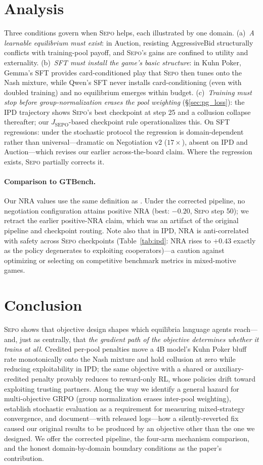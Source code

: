 \documentclass[letterpaper]{article} %
\newcommand{\sepo}{\textsc{Sepo}}
\newcommand{\Jsepo}{J_{\text{SEPO}}}
\begin{document}
\section{Analysis}
\label{sec:analysis}
Three conditions govern when \sepo{} helps, each illustrated by one domain. (a)~\emph{A learnable equilibrium must exist}: in Auction, resisting AggressiveBid structurally conflicts with training-pool payoff, and \sepo{}'s gains are confined to utility and externality. (b)~\emph{SFT must install the game's basic structure}: in Kuhn Poker, Gemma's SFT provides card-conditioned play that \sepo{} then tunes onto the Nash mixture, while Qwen's SFT never installs card-conditioning (even with doubled training) and no equilibrium emerges within budget. (c)~\emph{Training must stop before group-normalization erases the pool weighting} (\S\ref{sec:pg_loss}): the IPD trajectory shows \sepo{}'s best checkpoint at step 25 and a collusion collapse thereafter; our $\Jsepo$-based checkpoint rule operationalizes this. On SFT regressions: under the stochastic protocol the regression is domain-dependent rather than universal---dramatic on Negotiation v2 ($17\times$), absent on IPD and Auction---which revises our earlier across-the-board claim. Where the regression exists, \sepo{} partially corrects it.
\paragraph{Comparison to GTBench.} Our NRA values use the same definition as \citet{wu2024gtbench}. Under the corrected pipeline, no negotiation configuration attains positive NRA (best: $-0.20$, \sepo{} step 50); we retract the earlier positive-NRA claim, which was an artifact of the original pipeline and checkpoint routing. Note also that in IPD, NRA is anti-correlated with safety across \sepo{} checkpoints (Table~\ref{tab:ipd}: NRA rises to $+0.43$ exactly as the policy degenerates to exploiting cooperators)---a caution against optimizing or selecting on competitive benchmark metrics in mixed-motive games.
\section{Conclusion}
\label{sec:conclusion}
\sepo{} shows that objective design shapes which equilibria language agents reach---and, just as centrally, that \emph{the gradient path of the objective determines whether it trains at all}. Credited per-pool penalties move a 4B model's Kuhn Poker bluff rate monotonically onto the Nash mixture and hold collusion at zero while reducing exploitability in IPD; the same objective with a shared or auxiliary-credited penalty provably reduces to reward-only RL, whose policies drift toward exploiting trusting partners. Along the way we identify a general hazard for multi-objective GRPO (group normalization erases inter-pool weighting), establish stochastic evaluation as a requirement for measuring mixed-strategy convergence, and document---with released logs---how a silently-reverted fix caused our original results to be produced by an objective other than the one we designed. We offer the corrected pipeline, the four-arm mechanism comparison, and the honest domain-by-domain boundary conditions as the paper's contribution.
\end{document}
